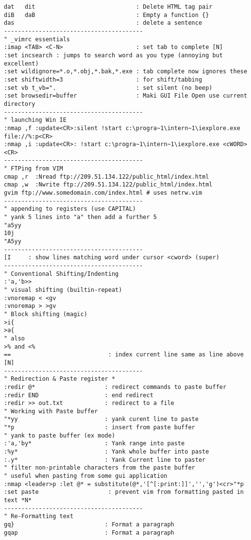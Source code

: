 \documentclass[10pt,landscape]{article}
\begin{document}
\begin{multicols}{2}
\begin{verbatim}
dat   dit                             : Delete HTML tag pair
diB   daB                             : Empty a function {}
das                                   : delete a sentence
----------------------------------------
" _vimrc essentials
:imap <TAB> <C-N>                     : set tab to complete [N]
:set incsearch : jumps to search word as you type (annoying but excellent)
:set wildignore=*.o,*.obj,*.bak,*.exe : tab complete now ignores these
:set shiftwidth=3                     : for shift/tabbing
:set vb t_vb=".                       : set silent (no beep)
:set browsedir=buffer                 : Maki GUI File Open use current directory
----------------------------------------
" launching Win IE
:nmap ,f :update<CR>:silent !start c:\progra~1\intern~1\iexplore.exe file://%:p<CR>
:nmap ,i :update<CR>: !start c:\progra~1\intern~1\iexplore.exe <cWORD><CR>
----------------------------------------
" FTPing from VIM
cmap ,r  :Nread ftp://209.51.134.122/public_html/index.html
cmap ,w  :Nwrite ftp://209.51.134.122/public_html/index.html
gvim ftp://www.somedomain.com/index.html # uses netrw.vim
----------------------------------------
" appending to registers (use CAPITAL)
" yank 5 lines into "a" then add a further 5
"a5yy
10j
"A5yy
----------------------------------------
[I     : show lines matching word under cursor <cword> (super)
----------------------------------------
" Conventional Shifting/Indenting
:'a,'b>>
" visual shifting (builtin-repeat)
:vnoremap < <gv
:vnoremap > >gv
" Block shifting (magic)
>i{
>a{
" also
>% and <%
==                            : index current line same as line above [N]
----------------------------------------
" Redirection & Paste register *
:redir @*                    : redirect commands to paste buffer
:redir END                   : end redirect
:redir >> out.txt            : redirect to a file
" Working with Paste buffer
"*yy                         : yank curent line to paste
"*p                          : insert from paste buffer
" yank to paste buffer (ex mode)
:'a,'by*                     : Yank range into paste
:%y*                         : Yank whole buffer into paste
:.y*                         : Yank Current line to paster
" filter non-printable characters from the paste buffer
" useful when pasting from some gui application
:nmap <leader>p :let @* = substitute(@*,'[^[:print:]]','','g')<cr>"*p
:set paste                    : prevent vim from formatting pasted in text *N*
----------------------------------------
" Re-Formatting text
gq}                          : Format a paragraph
gqap                         : Format a paragraph

\end{verbatim}
\end{multicols}
\end{document}
